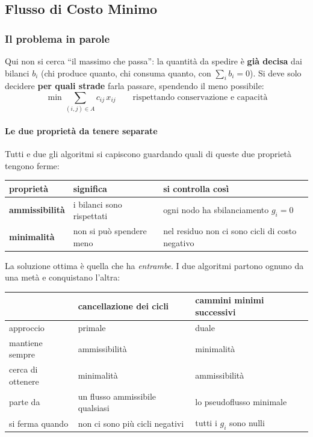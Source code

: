 \documentclass[12pt]{extarticle} %
\begin{document}
\subsection{Flusso di Costo Minimo}

\subsubsection{Il problema in parole}
Qui non si cerca ``il massimo che passa'': la quantità da spedire è \textbf{già decisa} dai bilanci $b_i$ (chi produce quanto, chi consuma quanto, con $\sum_i b_i = 0$). Si deve solo decidere \textbf{per quali strade} farla passare, spendendo il meno possibile:
\[
\min \sum_{(i,j) \in A} c_{ij}\,x_{ij} \qquad \text{rispettando conservazione e capacità}
\]

\paragraph{Le due proprietà da tenere separate}
Tutti e due gli algoritmi si capiscono guardando quali di queste due proprietà tengono ferme:
\begin{center}
\begin{tabular}{lll}
\hline
\textbf{proprietà} & \textbf{significa} & \textbf{si controlla così} \\
\hline
\textbf{ammissibilità} & i bilanci sono rispettati & ogni nodo ha sbilanciamento $g_i = 0$ \\
\textbf{minimalità} & non si può spendere meno & nel residuo non ci sono cicli di costo negativo \\
\hline
\end{tabular}
\end{center}
La soluzione ottima è quella che ha \emph{entrambe}. I due algoritmi partono ognuno da una metà e conquistano l'altra:
\begin{center}
\begin{tabular}{lll}
\hline
 & \textbf{cancellazione dei cicli} & \textbf{cammini minimi successivi} \\
\hline
approccio & primale & duale \\
mantiene sempre & ammissibilità & minimalità \\
cerca di ottenere & minimalità & ammissibilità \\
parte da & un flusso ammissibile qualsiasi & lo pseudoflusso minimale \\
si ferma quando & non ci sono più cicli negativi & tutti i $g_i$ sono nulli \\
\hline
\end{tabular}
\end{center}
\end{document}
